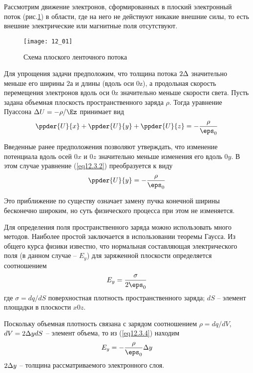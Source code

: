 
Рассмотрим движение электронов, сформированных в плоский электронный поток 
(рис.\ref{img12.1}) в области, где на него не действуют никакие внешние силы, 
то есть внешние электрические или магнитные поля отсутствуют.

\begin{figure}[h!]
	\center
	\texttt{[image: 12\_01]}
	\caption{Схема плоского ленточного потока}
	\label{img12.1}
\end{figure}

Для упрощения задачи предположим, что толщина потока \( 2\Delta \) значительно 
меньше его ширины \( 2а \) и длины (вдоль оси 0z), а продольная скорость 
перемещения электронов вдоль оси 0z значительно меньше скорости света. Пусть 
задана объемная плоскость пространственного заряда \( \rho \). Тогда уравнение 
Пуассона \( \D U = -\rho / \Ez \) принимает вид
\begin{equation}
	\ppder{U}{x} + \ppder{U}{y} + \ppder{U}{z} = -\frac{\rho}{\eps_0}
	\label{eq12.3.2}
\end{equation}

Введенные ранее предположения позволяют утверждать, что изменение потенциала 
вдоль осей \( 0x \) и \( 0z \) значительно меньше изменения его вдоль 
\( 0y \). В этом случае уравнение (\ref{eq12.3.2}) преобразуется к виду
\begin{equation}
	\ppder{U}{y} = -\frac{\rho}{\eps_0}
	\label{eq12.3.3}
\end{equation}
 
Это приближение по существу означает замену пучка конечной ширины бесконечно 
широким, но суть физического процесса при этом не изменяется.

Для определения поля пространственного заряда можно использовать много 
методов. Наиболее простой заключается в использовании теоремы Гаусса. Из 
общего курса физики известно, что нормальная составляющая электрического поля 
(в данном случае -- \( E_y \)) для заряженной плоскости определяется
соотношением
\begin{equation}
	E_y = \frac{\sigma}{2\eps_0}
	\label{eq12.3.4}
\end{equation}
где \( \sigma = dq/dS \) поверхностная плотность пространственного заряда;
\( dS \) -- элемент площадки в плоскости \( x0z \).

Поскольку объемная плотность связана с зарядом соотношением 
\( \rho = dq/dV \), \( dV = 2\Delta ydS \) -- элемент объема, то из 
(\ref{eq12.3.4}) находим
\begin{equation}
	E_y = -\frac{\rho}{\eps_0}\D y
	\label{eq12.3.5}
\end{equation}
\( 2\Delta y \) -- толщина рассматриваемого электронного слоя.

